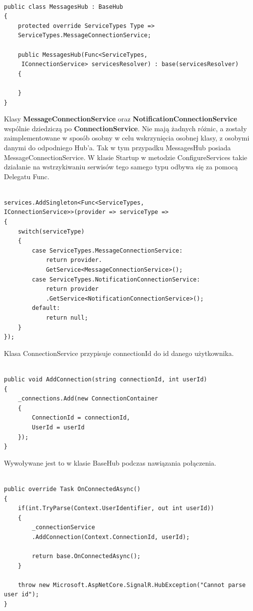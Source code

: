 \documentclass[12pt,a4paper]{article}
\begin{document}
\begin{lstlisting}[caption={Implementacja klasy MessageHub}]

public class MessagesHub : BaseHub
{
	protected override ServiceTypes Type => 
	ServiceTypes.MessageConnectionService;
	
	public MessagesHub(Func<ServiceTypes,
	 IConnectionService> servicesResolver) : base(servicesResolver)
	{
	
	}
}

\end{lstlisting}

Klasy \textbf{MessageConnectionService} oraz \textbf{NotificationConnectionService} wspólnie dziedziczą po \textbf{ConnectionService}. Nie mają żadnych różnic, a zostały zaimplementowane w sposób osobny w celu wskrzynięcia osobnej klasy, z osobymi danymi do odpodniego Hub'a. Tak w tym przypadku MessagesHub posiada MessageConnectionService. W klasie Startup w metodzie ConfigureServices takie działanie na wstrzykiwaniu serwisów tego samego typu odbywa się za pomocą Delegatu Func.

\begin{lstlisting}[caption={Implementacja DI na dwóch klasach tego samego typu}]

services.AddSingleton<Func<ServiceTypes, 
IConnectionService>>(provider => serviceType =>
{
	switch(serviceType)
	{
		case ServiceTypes.MessageConnectionService:
			return provider.
			GetService<MessageConnectionService>();
		case ServiceTypes.NotificationConnectionService:
			return provider
			.GetService<NotificationConnectionService>();
		default:
			return null;
	}
});

\end{lstlisting}

Klasa ConnectionService przypisuje connectionId do id danego użytkownika.

\begin{lstlisting}[caption={Dodanie wpisu do słownika na temat id połączenia i użytkownika}]

public void AddConnection(string connectionId, int userId)
{
	_connections.Add(new ConnectionContainer
	{
		ConnectionId = connectionId,
		UserId = userId
	});
}

\end{lstlisting}

Wywoływane jest to w klasie BaseHub podczas nawiązania połączenia.

\begin{lstlisting}[caption={Dodanie wpisu do słownika na temat id połączenia i użytkownika}]

public override Task OnConnectedAsync()
{
	if(int.TryParse(Context.UserIdentifier, out int userId))
	{
		_connectionService
		.AddConnection(Context.ConnectionId, userId);
	
		return base.OnConnectedAsync();
	}
	
	throw new Microsoft.AspNetCore.SignalR.HubException("Cannot parse user id");
}

\end{lstlisting}
\end{document}
